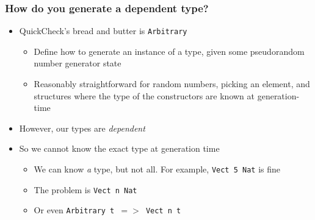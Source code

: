 \documentclass[compress,handout]{beamer}
\begin{document}
\begin{frame}
  \frametitle{How do you generate a dependent type?}

  \begin{itemize}
    \item QuickCheck's bread and butter is \texttt{Arbitrary}
    \begin{itemize}
      \item Define how to generate an instance of a type, given some
            pseudorandom number generator state
      \item Reasonably straightforward for random numbers, picking an element,
            and structures where the type of the constructors are known at
            generation-time
    \end{itemize}
    \item However, our types are \textit{dependent}
    \item So we cannot know the exact type at generation time
    \begin{itemize}
      \item We can know \textit{a} type, but not all. For example, \texttt{Vect
            5 Nat} is fine
      \item The problem is \texttt{Vect n Nat}
      \item Or even \texttt{Arbitrary t $=>$ Vect n t}
    \end{itemize}
  \end{itemize}

\end{frame}
\end{document}
